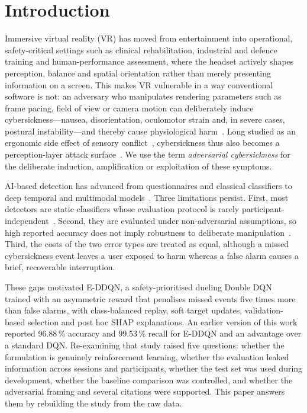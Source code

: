 \section{Introduction}
\label{sec:intro}
Immersive virtual reality (VR) has moved from entertainment into operational, safety-critical settings such as clinical rehabilitation, industrial and defence training and human-performance assessment, where the headset actively shapes perception, balance and spatial orientation rather than merely presenting information on a screen. This makes VR vulnerable in a way conventional software is not: an adversary who manipulates rendering parameters such as frame pacing, field of view or camera motion can deliberately induce cybersickness---nausea, disorientation, oculomotor strain and, in severe cases, postural instability---and thereby cause physiological harm~\cite{tseng2022dark,odeleye2021framerate,kundu2025securing}. Long studied as an ergonomic side effect of sensory conflict~\cite{caserman2021cybersickness}, cybersickness thus also becomes a perception-layer attack surface~\cite{odeleye2023virtually,giaretta2025security}. We use the term \emph{adversarial cybersickness} for the deliberate induction, amplification or exploitation of these symptoms.

AI-based detection has advanced from questionnaires and classical classifiers to deep temporal and multimodal models~\cite{dennison2016physio,islam2020automatic,islam2021fusion,liu2024cnneca,yalcin2024automatic,jeong2024precyse}. Three limitations persist. First, most detectors are static classifiers whose evaluation protocol is rarely participant-independent~\cite{yang2022mlreview}. Second, they are evaluated under non-adversarial assumptions, so high reported accuracy does not imply robustness to deliberate manipulation~\cite{kundu2025securing}. Third, the costs of the two error types are treated as equal, although a missed cybersickness event leaves a user exposed to harm whereas a false alarm causes a brief, recoverable interruption.

These gaps motivated E-DDQN, a safety-prioritised dueling Double DQN~\cite{vanhasselt2016double,wang2016dueling} trained with an asymmetric reward that penalises missed events five times more than false alarms, with class-balanced replay, soft target updates, validation-based selection and post hoc SHAP explanations. An earlier version of this work reported 96.88\,\% accuracy and 99.53\,\% recall for E-DDQN and an advantage over a standard DQN. Re-examining that study raised five questions: whether the formulation is genuinely reinforcement learning, whether the evaluation leaked information across sessions and participants, whether the test set was used during development, whether the baseline comparison was controlled, and whether the adversarial framing and several citations were supported. This paper answers them by rebuilding the study from the raw data.

